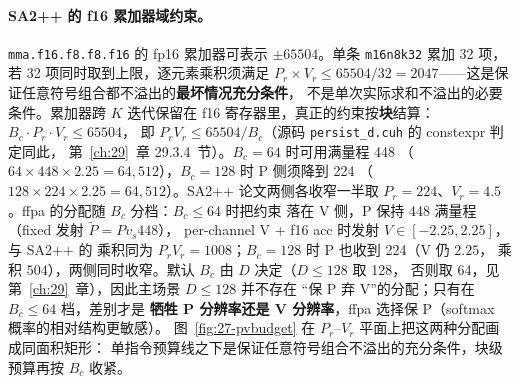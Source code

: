 \paragraph{SA2++ 的 f16 累加器域约束。}
\texttt{mma.f16.f8.f8.f16} 的 fp16 累加器可表示 $\pm 65504$。单条 \texttt{m16n8k32}
累加 32 项，若 32 项同时取到上限，逐元素乘积须满足 $P_r \times V_r \le
65504/32 = 2047$——这是保证任意符号组合都不溢出的\textbf{最坏情况充分条件}，
不是单次实际求和不溢出的必要条件。累加器跨 $K$ 迭代保留在
f16 寄存器里，真正的约束按\textbf{块}结算：$B_c \cdot P_r \cdot V_r \le 65504$，
即 $P_rV_r \le 65504/B_c$（源码 \texttt{persist\_d.cuh} 的 constexpr 判定同此，
第~\ref{ch:29}~章 29.3.4~节）。$B_c{=}64$ 时可用满量程 448
（$64\times448\times2.25=64{,}512$），$B_c{=}128$ 时 P 侧须降到 224
（$128\times224\times2.25=64{,}512$）。SA2++ 论文两侧各收窄一半取
$P_r = 224$、$V_r = 4.5$。ffpa 的分配随 $B_c$ 分档：$B_c\le64$ 时把约束
落在 V 侧，P 保持 448 满量程（fixed 发射 $\tilde{P} = P v_s 448$），
per-channel V + f16 acc 时发射 $\hat{V} \in [-2.25, 2.25]$，与 SA2++ 的
乘积同为 $P_rV_r = 1008$；$B_c{=}128$ 时 P 也收到 224（V 仍 $2.25$，
乘积 $504$），两侧同时收窄。默认 $B_c$ 由 $D$ 决定（$D\le128$ 取 128，
否则取 64，见第~\ref{ch:29}~章），因此主场景 $D\le128$ 并不存在
“保 P 弃 V”的分配；只有在 $B_c\le64$ 档，差别才是
\textbf{牺牲 P 分辨率还是 V 分辨率}，ffpa 选择保 P（softmax 概率的相对结构更敏感）。
图~\ref{fig:27-pvbudget} 在 $P_r$--$V_r$ 平面上把这两种分配画成同面积矩形：
单指令预算线之下是保证任意符号组合不溢出的充分条件，块级预算再按 $B_c$ 收紧。


